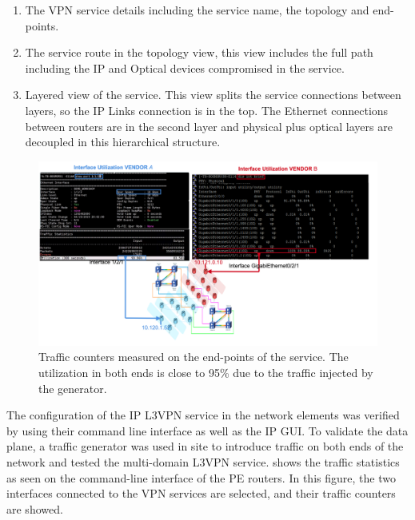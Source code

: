 \documentclass[10pt, conference]{IEEEtran}
\begin{document}
\begin{enumerate}
    \item The VPN service details including the service name, the topology and end-points. 
    \item The service route in the topology view, this view includes the full path including the IP and Optical devices compromised in the service.
    \item Layered view of the service. This view splits the service connections between layers, so the IP Links connection is in the top. The Ethernet connections between routers are in the second layer and physical plus optical layers are decoupled in this hierarchical structure.
\end{enumerate}

\begin{figure}
	\centering
		\includegraphics[width=\linewidth]{figs/counters1.png}
	\caption{Traffic counters measured on the end-points of the service. The utilization in both ends is close to 95\% due to the traffic injected by the generator.}
	\label{FIG:counters}
\end{figure}


The configuration of the IP L3VPN service in the network elements was verified by using their command line interface as well as the IP GUI. To validate the data plane, a traffic generator was used in site to introduce traffic on both ends of the network and tested the multi-domain L3VPN service.  shows the traffic statistics as seen on the command-line interface of the PE routers. In this figure, the two interfaces connected to the VPN services are selected, and their traffic counters are showed.  
\end{document}
